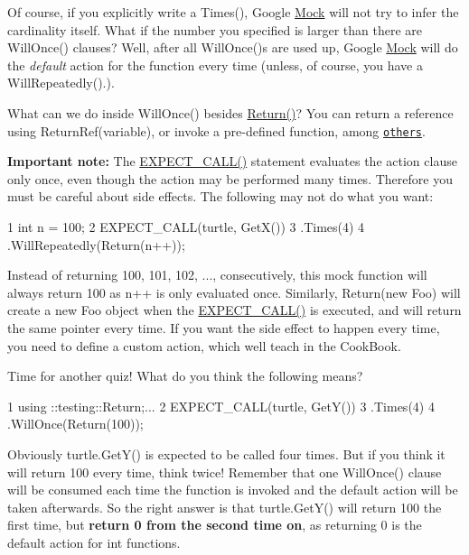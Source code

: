 Of course, if you explicitly write a {\ttfamily Times()}, Google \hyperlink{classMock}{Mock} will not try to infer the cardinality itself. What if the number you specified is larger than there are {\ttfamily Will\+Once()} clauses? Well, after all {\ttfamily Will\+Once()}s are used up, Google \hyperlink{classMock}{Mock} will do the {\itshape default} action for the function every time (unless, of course, you have a {\ttfamily Will\+Repeatedly()}.).

What can we do inside {\ttfamily Will\+Once()} besides {\ttfamily \hyperlink{namespacetesting_af6d1c13e9376c77671e37545cd84359c}{Return()}}? You can return a reference using {\ttfamily Return\+Ref(variable)}, or invoke a pre-\/defined function, among \href{http://code.google.com/p/googlemock/wiki/V1_7_CheatSheet#Actions}{\tt others}.

{\bfseries Important note\+:} The {\ttfamily \hyperlink{gmock-spec-builders_8h_a535a6156de72c1a2e25a127e38ee5232}{E\+X\+P\+E\+C\+T\+\_\+\+C\+A\+L\+L()}} statement evaluates the action clause only once, even though the action may be performed many times. Therefore you must be careful about side effects. The following may not do what you want\+:


\begin{DoxyCode}
1 int n = 100;
2 EXPECT\_CALL(turtle, GetX())
3 .Times(4)
4 .WillRepeatedly(Return(n++));
\end{DoxyCode}


Instead of returning 100, 101, 102, ..., consecutively, this mock function will always return 100 as {\ttfamily n++} is only evaluated once. Similarly, {\ttfamily Return(new Foo)} will create a new {\ttfamily Foo} object when the {\ttfamily \hyperlink{gmock-spec-builders_8h_a535a6156de72c1a2e25a127e38ee5232}{E\+X\+P\+E\+C\+T\+\_\+\+C\+A\+L\+L()}} is executed, and will return the same pointer every time. If you want the side effect to happen every time, you need to define a custom action, which we\textquotesingle{}ll teach in the Cook\+Book.

Time for another quiz! What do you think the following means?


\begin{DoxyCode}
1 using ::testing::Return;...
2 EXPECT\_CALL(turtle, GetY())
3 .Times(4)
4 .WillOnce(Return(100));
\end{DoxyCode}


Obviously {\ttfamily turtle.\+Get\+Y()} is expected to be called four times. But if you think it will return 100 every time, think twice! Remember that one {\ttfamily Will\+Once()} clause will be consumed each time the function is invoked and the default action will be taken afterwards. So the right answer is that {\ttfamily turtle.\+Get\+Y()} will return 100 the first time, but {\bfseries return 0 from the second time on}, as returning 0 is the default action for {\ttfamily int} functions.

